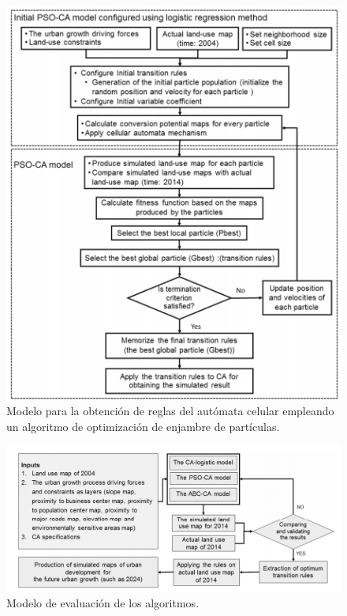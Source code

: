 \begin{figure}[h]
	\centering
	\includegraphics[width=\linewidth]{fig/pso}
	\caption{Modelo para la obtención de reglas del autómata celular empleando un algoritmo de optimización de enjambre de partículas.}
	\label{fig:pso}
\end{figure}

\begin{figure}[h]
	\centering
	\includegraphics[width=\linewidth]{fig/evaluation}
	\caption{Modelo de evaluación de los algoritmos.}
	\label{fig:evaluation}
\end{figure}


